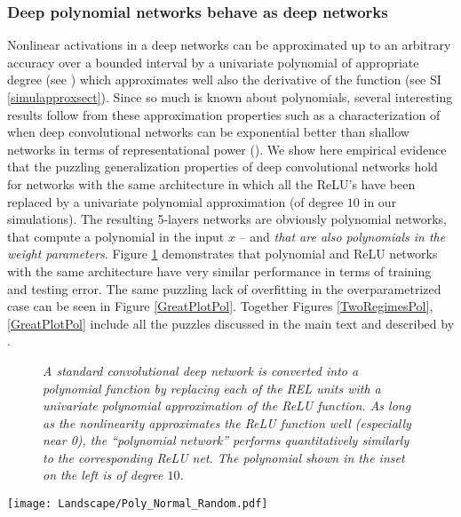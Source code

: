 \documentclass[10pt]{article}
\begin{document}
\subsubsection{Deep polynomial networks behave as deep networks}

Nonlinear activations in a deep networks can be approximated up to an
arbitrary accuracy over a bounded interval by a univariate polynomial
of appropriate degree (see \cite{Theory_II}) which approximates well
also the derivative of the function (see SI
\ref{simulapproxsect}). Since so much is known about polynomials,
several interesting results follow from these approximation properties
such as a characterization of when deep convolutional networks can be
exponential better than shallow networks in terms of representational
power (\cite{Theory_I}).  We show here empirical evidence that the
puzzling generalization properties of deep convolutional networks hold
for networks with the same architecture in which all the ReLU's have
been replaced by a univariate polynomial approximation (of degree $10$
in our simulations).  The resulting 5-layers networks are obviously
polynomial networks, that compute a polynomial in the input $x$ -- and
{\it that are also polynomials in the weight parameters}. Figure
\ref{fig:relu_vs_polynomial} demonstrates that polynomial and ReLU
networks with the same architecture have very similar performance in
terms of training and testing error.  The same puzzling lack of overfitting
in the overparametrized case can be seen in Figure
\ref{GreatPlotPol}. Together Figures
\ref{TwoRegimesPol},\ref{GreatPlotPol}
include all the puzzles discussed in the main text and described by
\cite{DBLP:journals/corr/ZhangBHRV16}. 


\begin{figure}
  \centering  
{}
\caption{\it A standard convolutional deep network is converted into a
  polynomial function by replacing each of the REL units with a
  univariate polynomial approximation of the ReLU function. As long as
  the nonlinearity approximates the ReLU function well (especially
  near 0), the ``polynomial network'' performs quantitatively
  similarly to the corresponding ReLU net. The polynomial shown in the
  inset on the left is of degree $10$.}
\label{fig:relu_vs_polynomial}   
\end{figure} 



\begin{figure*}[h!]\centering
\texttt{[image: Landscape/Poly\_Normal\_Random.pdf]}
\caption{\it The figure (left) shows the behavior of a polynomial deep network trained on
  subsets of the CIFAR database. The figure on the right shows the
  same network trained on
  subsets of the CIFAR database in which the labels have been randomly
  scrambled.  The network is a 5-layer all
  convolutional network (i.e., no pooling) with 16 channels per hidden
  layer , resulting in only $W \approx 10000$ weights instead of the
  typical $300,000$. Neither data augmentation nor regularization is performed.} 
\label{TwoRegimesPol}
\end{figure*}
\end{document}
